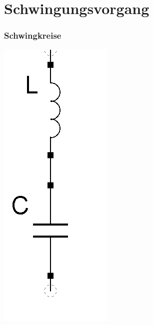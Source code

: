 

\subtitle{Technik Klasse A 04: \\
          Schwingkreise \& Filter \\[2em]}
\date{Stand \today}



\section*{Schwingungsvorgang}
\begin{frame}
\frametitle{Schwingkreise}
	\begin{center}
		\includegraphics[scale=0.4]{a04/Schwingkreis_reihe.png}

\end{center}
\end{frame}
